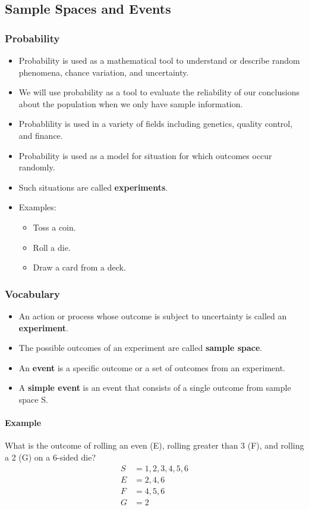 \subsection{Sample Spaces and Events}
\hrulefill

\subsubsection*{Probability}
\begin{itemize}
    \item Probability is used as a mathematical tool to understand or describe random phenomena, chance variation, and uncertainty. 
    \item We will use probability as a tool to evaluate the reliability of our conclusions about the population when we only have sample information.
    \item Probablility is used in a variety of fields including genetics, quality control, and finance.
    \item Probability is used as a model for situation for which outcomes occur randomly.
    \item Such situations are called \textbf{experiments}.
    \item Examples:
    \begin{itemize}
        \item Toss a coin.
        \item Roll a die.
        \item Draw a card from a deck.
    \end{itemize}
\end{itemize}

\subsubsection*{Vocabulary}
\begin{itemize}
    \item An action or process whose outcome is subject to uncertainty is called an \textbf{experiment}.
    \item The possible outcomes of an experiment are called \textbf{sample space}.
    \item An \textbf{event} is a specific outcome or a set of outcomes from an experiment.
    \item A \textbf{simple event} is an event that consists of a single outcome from sample space S.
\end{itemize}

\paragraph*{Example} What is the outcome of rolling an even (E), rolling greater than 3 (F), and rolling a 2 (G) on a 6-sided die?
\begin{align*}
    S &= {1, 2, 3, 4, 5, 6}\\
    E &= {2, 4, 6}\\
    F &= {4, 5, 6}\\
    G &= {2}
\end{align*}


